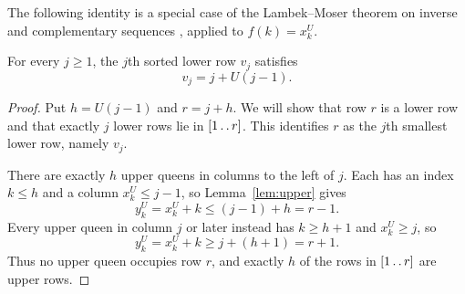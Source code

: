 \begin{samepage}
The following identity is a special case of the Lambek--Moser theorem on
inverse and complementary sequences \cite{LM}, applied to $f(k)=x_k^U$. 
\begin{lemma}\label{lem:complement}
For every $j\ge1$, the $j$th sorted lower row $v_j$ satisfies
\begin{equation}\label{eq:sorted-rows}
 v_j=j+U(j-1).
\end{equation}
\end{lemma}
\noindent
\begin{minipage}[t]{0.60\linewidth}
\vspace{0pt}
\begin{proof}
Put $h=U(j-1)$ and $r=j+h$. We will show that row $r$ is a lower row
and that exactly $j$ lower rows lie in $[1\mathinner{\ldotp\ldotp} r]$. This identifies $r$
as the $j$th smallest lower row, namely $v_j$.

There are exactly $h$ upper queens in columns to the left of $j$. Each has an
index $k\le h$ and a column $x_k^U\le j-1$, so Lemma~\ref{lem:upper} gives
\[
 y_k^U=x_k^U+k\le(j-1)+h=r-1.
\]
Every upper queen in column $j$ or later instead has $k\ge h+1$ and
$x_k^U\ge j$, so
\[
 y_k^U=x_k^U+k\ge j+(h+1)=r+1.
\]
Thus no upper queen occupies row $r$, and exactly $h$ of the rows in
$[1\mathinner{\ldotp\ldotp} r]$ are upper rows.


\end{proof}
\end{minipage}
\end{samepage}
